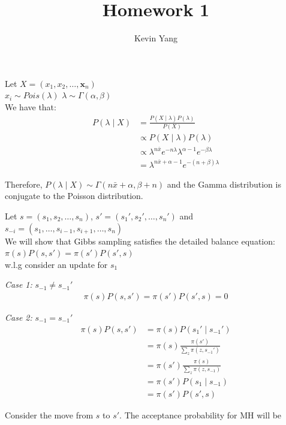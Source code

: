 \documentclass[10pt]{homeworg}
\title{Homework 1}
\author{Kevin Yang}
\begin{document}
\maketitle

\exercise
Let $X = (x_1, x_2, \ldots, \boldsymbol x_n)$ \\
\vspace{0.5cm}
$x_i \sim Pois(\lambda)$  \hspace{2cm} $\lambda \sim \Gamma(\alpha, \beta)$
\\
We have that:
\begin{align*}
P(\lambda \mid X) &= \frac{P(X \mid \lambda)P(\lambda)}{P(X)}\\
				  &\propto P(X \mid \lambda)P(\lambda)\\
				  &\propto \lambda^{n\bar{x}}e^{-n\lambda}\lambda^{\alpha-1}e^{-\beta\lambda}\\
				  &= \lambda^{n\bar{x}+\alpha-1}e^{-(n+\beta)\lambda}
\end{align*}

Therefore, $P(\lambda \mid X) \sim \Gamma(n\bar{x}+\alpha, \beta+n)$ and the Gamma distribution is conjugate to the Poisson distribution.

\exercise
Let $s = (s_1, s_2, \ldots, s_n)$, $s' = (s_1', s_2', \ldots, s_n')$ and $s_{-i} = (s_1, \ldots, s_{i-1}, s_{i+1}, \ldots, s_n)$\\
We will show that Gibbs sampling satisfies the detailed balance equation: $\pi(s)P(s,s')=\pi(s')P(s',s)$\\

w.l.g consider an update for $s_1$\\
\vspace{0.5cm}

\textit{Case 1:} $s_{-1} \neq s_{-1}'$
\begin{align*}
\pi(s)P(s,s') = \pi(s')P(s',s) = 0
\end{align*}


\textit{Case 2:} $s_{-1} = s_{-1}'$
\begin{align*}
\pi(s)P(s,s') &= \pi(s)P(s_1' \mid s_{-1}')\\
			  &= \pi(s)\frac{\pi(s')}{\sum_z \pi(z, s_{-1}')}\\
			  &= \pi(s')\frac{\pi(s)}{\sum_z \pi(z, s_{-1})}\\
			  &= \pi(s')P(s_1 \mid s_{-1})\\
			  &= \pi(s')P(s',s)
\end{align*}

Consider the move from $s$ to $s'$. The acceptance probability for MH will be
\end{document}
